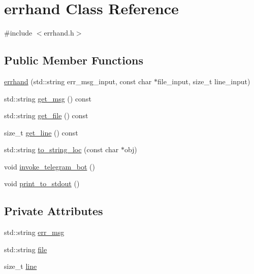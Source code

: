 \hypertarget{classerrhand}{}\section{errhand Class Reference}
\label{classerrhand}


{\ttfamily \#include $<$errhand.\+h$>$}

\subsection*{Public Member Functions}
\begin{DoxyCompactItemize}
\item 
\mbox{\hyperlink{classerrhand_a69afd61e0ebf5ee9d35f297dc2d5c086}{errhand}} (std\+::string err\+\_\+msg\+\_\+input, const char $\ast$file\+\_\+input, size\+\_\+t line\+\_\+input)
\item 
std\+::string \mbox{\hyperlink{classerrhand_a524dfc6821f703329d8801dd3298f33f}{get\+\_\+msg}} () const
\item 
std\+::string \mbox{\hyperlink{classerrhand_a1556ee8d0aaefeea3bbab73f7ae50914}{get\+\_\+file}} () const
\item 
size\+\_\+t \mbox{\hyperlink{classerrhand_a258f97d84476b21efc38827cda3e5889}{get\+\_\+line}} () const
\item 
std\+::string \mbox{\hyperlink{classerrhand_a930df1c197154853159683cb2ad55369}{to\+\_\+string\+\_\+loc}} (const char $\ast$obj)
\item 
void \mbox{\hyperlink{classerrhand_adbc86e81b391a68d2bf9a13529c977d3}{invoke\+\_\+telegram\+\_\+bot}} ()
\item 
void \mbox{\hyperlink{classerrhand_a5b4d8a74f1d0c6842526dc8b54e38dc2}{print\+\_\+to\+\_\+stdout}} ()
\end{DoxyCompactItemize}
\subsection*{Private Attributes}
\begin{DoxyCompactItemize}
\item 
std\+::string \mbox{\hyperlink{classerrhand_a2baa975c76a80afce9c97575c549058c}{err\+\_\+msg}}
\item 
std\+::string \mbox{\hyperlink{classerrhand_aed73d7a312fae4b4387d8d2487277a74}{file}}
\item 
size\+\_\+t \mbox{\hyperlink{classerrhand_a3ddc204c758b97e7d1550019e4513f3b}{line}}
\end{DoxyCompactItemize}


